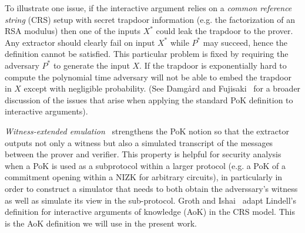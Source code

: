 \documentclass{article}
\theoremstyle{definition}
\begin{document}
To illustrate one issue, if the interactive argument relies on a \emph{common reference string} (CRS) setup with secret trapdoor information (e.g. the factorization of an RSA modulus) then one of the inputs $X^*$ could leak the trapdoor to the prover. Any extractor should clearly fail on input $X^*$ while $P^*$ may succeed, hence the definition cannot be satisfied. This particular problem is fixed by requiring the adversary $P^*$ to generate the input $X$. If the trapdoor is exponentially hard to compute the polynomial time adversary will not be able to embed the trapdoor in $X$ except with negligible probability. (See Damg\r{a}rd and Fujisaki~\cite{AC:DamFuj02} for a broader discussion of the issues that arise when applying the standard PoK definition to interactive arguments).

\emph{Witness-extended emulation}~\cite{EC:Lindell03} strengthens the PoK notion so that the extractor outputs not only a witness but also a simulated transcript of the messages between the prover and verifier. This property is helpful for security analysis when a PoK is used as a subprotocol within a larger protocol (e.g. a PoK of a commitment opening within a NIZK for arbitrary circuits), in particularly in order to construct a simulator that needs to both obtain the adverssary's witness as well as simulate its view in the sub-protocol. Groth and Ishai~\cite{EC:GroIsh08} adapt Lindell's definition for interactive arguments of knowledge (AoK) in the CRS model. This is the AoK definition we will use in the present work.
\end{document}
